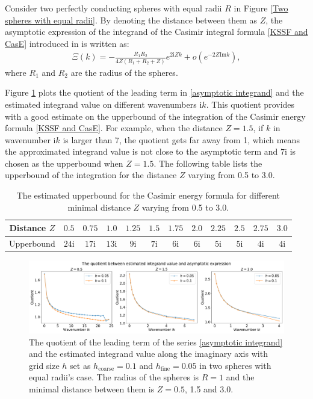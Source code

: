 Consider two perfectly conducting spheres with equal radii $R$ in Figure \ref{Two spheres with equal radii}. By denoting the distance between them as $Z$, 
the asymptotic expression of the integrand of the Casimir integral formula \eqref{KSSF and CasE} introduced in \cite{fang2021singularity} is written as:
\begin{align}\label{asymptotic integrand}
    \Xi(k) = -\frac{R_{1}R_{2}}{4Z(R_{1} + R_{2} + Z)}e^{2\mathrm{i}Zk} + o\left(e^{-2Z\text{Im}k}\right),
\end{align}
where $R_{1}$ and $R_{2}$ are the radius of the spheres.

Figure \ref{Abs equal} plots the quotient of the leading term in \eqref{asymptotic integrand} and the estimated integrand value on different 
wavenumbers $\mathrm{i}k$. This quotient provides with a good estimate on the upperbound of the integration of the Casimir energy formula \eqref{KSSF and CasE}. 
For example, when the distance $Z = 1.5$, if $k$ in wavenumber $\mathrm{i}k$ is larger than 7, the quotient gets far away from 1, which means the approximated 
integrand value is not close to the asymptotic term and $7\mathrm{i}$ is chosen as the upperbound when $Z = 1.5$. The following table lists the upperbound 
of the integration for the distance $Z$ varying from 0.5 to 3.0.

\begin{table}[H]
    \centering
    \begin{tabular}{ |c|c|c|c|c|c|c|c|c|c|c|c| }
        \hline
        Distance $Z$ & $ 0.5$ & $ 0.75$  & $ 1.0$ & $1.25$ & $ 1.5$ & $1.75$  & $2.0$ & $2.25$ & $ 2.5$ & $ 2.75$  & $3.0$ \\\hline
        Upperbound & $24\mathrm{i}$ & $17\mathrm{i}$ & $13\mathrm{i}$ & $9\mathrm{i}$ & $7\mathrm{i}$ & $6\mathrm{i}$ & $6\mathrm{i}$ & $5\mathrm{i}$ & $5\mathrm{i}$ & $4\mathrm{i}$ & $4\mathrm{i}$ \\\hline
       \end{tabular}
       \caption{\label{Equal: distance and upperbound} The estimated upperbound for the Casimir energy formula for different minimal distance $Z$ varying from 
       0.5 to 3.0.}
\end{table}
 
\begin{figure}[H]
    \centering
    \hspace*{-1.4cm}\includegraphics[scale = 0.37]{figures/rel_err_equal.pdf}
    \caption{The quotient of the leading term of the series \eqref{asymptotic integrand} and the estimated integrand value along the imaginary axis
    with grid size $h$ set as $h_{\text{coarse}} = 0.1$ and $ h_{\text{fine}} = 0.05$ in two spheres with equal radii's case. The radius of the spheres is $R = 1$ and the minimal distance between them is $Z = 0.5$, 1.5 and 3.0. }
    \label{Abs equal}
\end{figure}


